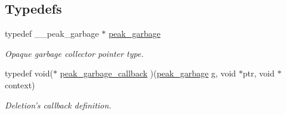 \subsection*{Typedefs}
\begin{CompactItemize}
\item 
\hypertarget{group__garbage_ga0}{
typedef \_\-\_\-peak\_\-garbage $\ast$ \hyperlink{group__garbage_ga0}{peak\_\-garbage}}
\label{group__garbage_ga0}

\begin{CompactList}\small\item\em Opaque garbage collector pointer type. \item\end{CompactList}\item 
\hypertarget{group__garbage_ga1}{
typedef void($\ast$ \hyperlink{group__garbage_ga1}{peak\_\-garbage\_\-callback} )(\hyperlink{group__garbage_ga0}{peak\_\-garbage} g, void $\ast$ptr, void $\ast$context)}
\label{group__garbage_ga1}

\begin{CompactList}\small\item\em Deletion's callback definition. \item\end{CompactList}\end{CompactItemize}
